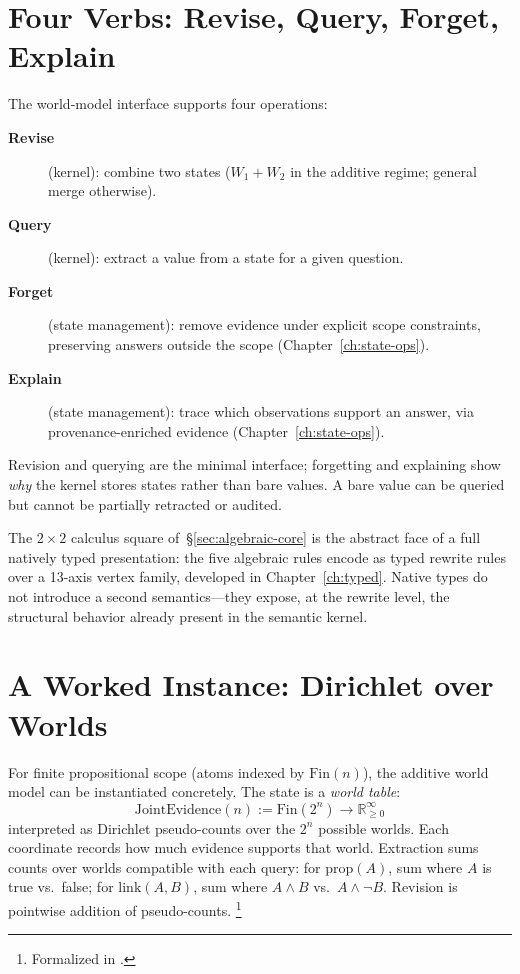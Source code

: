 \documentclass[11pt,openany]{report}
\begin{document}
\section{Four Verbs: Revise, Query, Forget, Explain}

The world-model interface supports four operations:

\begin{description}
\item[\textbf{Revise}] (kernel): combine two states ($W_1 + W_2$ in
  the additive regime; general merge otherwise).

\item[\textbf{Query}] (kernel): extract a value from a state for a
  given question.

\item[\textbf{Forget}] (state management): remove evidence under
  explicit scope constraints, preserving answers outside the scope
  (Chapter~\ref{ch:state-ops}).

\item[\textbf{Explain}] (state management): trace which observations
  support an answer, via provenance-enriched evidence
  (Chapter~\ref{ch:state-ops}).
\end{description}

\noindent
Revision and querying are the minimal interface; forgetting and
explaining show \emph{why} the kernel stores states rather than bare
values.  A bare value can be queried but cannot be partially retracted
or audited.

The $2 \times 2$ calculus square of~\S\ref{sec:algebraic-core} is
the abstract face of a full natively typed presentation: the five
algebraic rules encode as typed rewrite rules over a 13-axis vertex
family, developed in Chapter~\ref{ch:typed}.  Native types do not
introduce a second semantics---they expose, at the rewrite level, the
structural behavior already present in the semantic kernel.


\section{A Worked Instance: Dirichlet over Worlds}

For finite propositional scope (atoms indexed by $\mathrm{Fin}(n)$),
the additive world model can be instantiated concretely.  The state is
a \emph{world table}:
\[
  \mathrm{JointEvidence}(n) := \mathrm{Fin}(2^n) \to
  \mathbb{R}_{\ge 0}^{\infty}
\]
interpreted as Dirichlet pseudo-counts over the $2^n$ possible worlds.
Each coordinate records how much evidence supports that world.
Extraction sums counts over worlds compatible with each query:
for $\mathrm{prop}(A)$, sum where $A$ is true vs.\ false; for
$\mathrm{link}(A, B)$, sum where $A \wedge B$ vs.\ $A \wedge \neg B$.
Revision is pointwise addition of pseudo-counts.%
\footnote{Formalized in
.}
\end{document}
